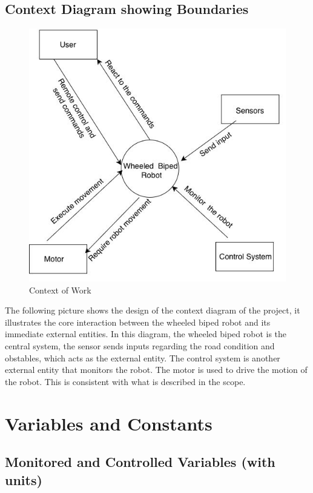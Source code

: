 \documentclass[12pt]{article}
\begin{document}
\subsection{Context Diagram showing Boundaries}
\begin{figure}[H]
    \centering
    \includegraphics[scale=0.7]{Context.jpg}
    \caption{Context of Work}
\end{figure}
The following picture shows the design of the context diagram of the project, it illustrates the core interaction between the wheeled biped robot and its immediate external entities. In this diagram, the wheeled biped robot is the central system, the sensor sends inputs regarding the road condition and obstables, which acts as the external entity. The control system is another external entity that monitors the robot. The motor is used to drive the motion of the robot. This is consistent with what is described in the scope.


\section{Variables and Constants}

\subsection{Monitored and Controlled Variables (with units)}
\end{document}
